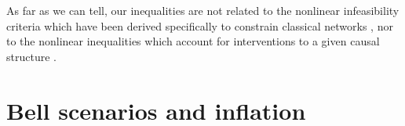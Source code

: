 As far as we can tell, our inequalities are not related to the nonlinear infeasibility criteria which have been derived specifically to constrain classical networks \cite{TavakoliStarNetworks,RossetNetworks,TavakoliNoncyclicNetworks}, nor to the nonlinear inequalities which account for interventions to a given causal structure \cite{kang2007polynomialconstraints,steeg2011relaxation}.




\section{Bell scenarios and inflation}

